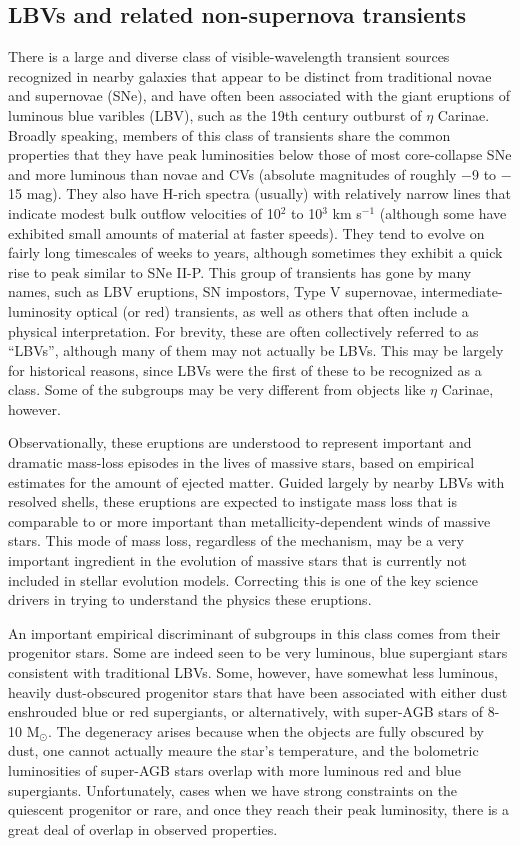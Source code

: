 
\subsection{LBVs and related non-supernova transients}

There is a large and diverse class of visible-wavelength transient
sources recognized in nearby galaxies that appear to be distinct from
traditional novae and supernovae (SNe), and have often been associated with
the giant eruptions of luminous blue varibles (LBV), such as the 19th
century outburst of $\eta$ Carinae.  Broadly speaking, members of this
class of transients share the common properties that they have peak
luminosities below those of most core-collapse SNe and more luminous
than novae and CVs (absolute magnitudes of roughly $-$9 to $-$15 mag).
They also have H-rich spectra (usually) with relatively narrow lines
that indicate modest bulk outflow velocities of 10$^2$ to 10$^3$ km
s$^{-1}$ (although some have exhibited small amounts of material at
faster speeds).  They tend to evolve on fairly long timescales of
weeks to years, although sometimes they exhibit a quick rise to peak
similar to SNe II-P. This group of transients has gone by many names,
such as LBV eruptions, SN impostors, Type V supernovae,
intermediate-luminosity optical (or red) transients, as well as others
that often include a physical interpretation.  For brevity, these are
often collectively referred to as ``LBVs'', although many of them may
not actually be LBVs. This may be largely for historical reasons,
since LBVs were the first of these to be recognized as a class.  Some
of the subgroups may be very different from objects like $\eta$
Carinae, however.

Observationally, these eruptions are understood to represent important
and dramatic mass-loss episodes in the lives of massive stars, based
on empirical estimates for the amount of ejected matter.  Guided
largely by nearby LBVs with resolved shells, these eruptions are
expected to instigate mass loss that is comparable to or more
important than metallicity-dependent winds of massive stars.  This
mode of mass loss, regardless of the mechanism, may be a very
important ingredient in the evolution of massive stars that is
currently not included in stellar evolution models.  Correcting this
is one of the key science drivers in trying to understand the physics
these eruptions.

An important empirical discriminant of subgroups in this class comes
from their progenitor stars.  Some are indeed seen to be very
luminous, blue supergiant stars consistent with traditional LBVs.
Some, however, have somewhat less luminous, heavily dust-obscured
progenitor stars that have been associated with either dust enshrouded
blue or red supergiants, or alternatively, with super-AGB stars of
8-10 M$_{\odot}$.  The degeneracy arises because when the objects are
fully obscured by dust, one cannot actually meaure the star's
temperature, and the bolometric luminosities of super-AGB stars
overlap with more luminous red and blue supergiants.  Unfortunately,
cases when we have strong constraints on the quiescent progenitor or
rare, and once they reach their peak luminosity, there is a great deal
of overlap in observed properties.

